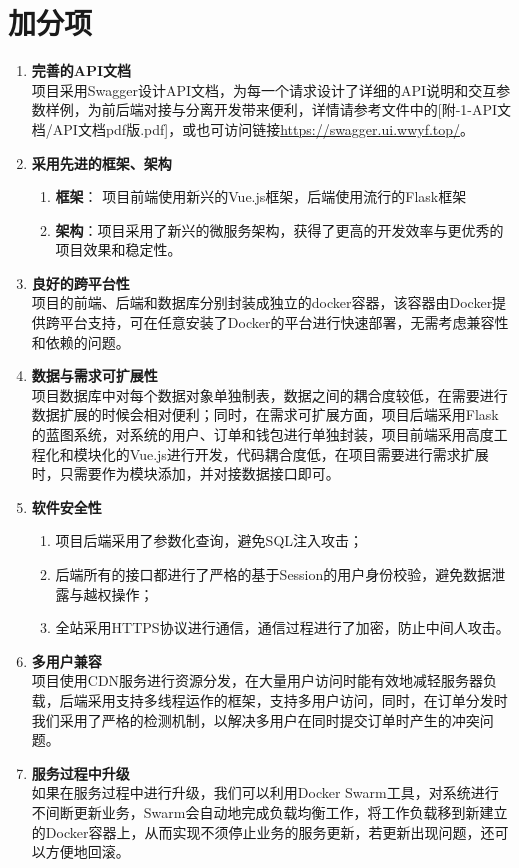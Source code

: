 \chapter{加分项}

\begin{enumerate}
    \item \textbf{完善的API文档} \\
    项目采用Swagger设计API文档，为每一个请求设计了详细的API说明和交互参数样例，为前后端对接与分离开发带来便利，详情请参考文件中的[附-1-API文档/API文档pdf版.pdf]，或也可访问链接\url{https://swagger.ui.wwyf.top/}。
    \item \textbf{采用先进的框架、架构} 
    \begin{enumerate}
        \item \textbf{框架}： 项目前端使用新兴的Vue.js框架，后端使用流行的Flask框架
        \item \textbf{架构}：项目采用了新兴的微服务架构，获得了更高的开发效率与更优秀的项目效果和稳定性。
    \end{enumerate}
    \item \textbf{良好的跨平台性} \\
    项目的前端、后端和数据库分别封装成独立的docker容器，该容器由Docker提供跨平台支持，可在任意安装了Docker的平台进行快速部署，无需考虑兼容性和依赖的问题。
    \item \textbf{数据与需求可扩展性} \\
    项目数据库中对每个数据对象单独制表，数据之间的耦合度较低，在需要进行数据扩展的时候会相对便利；同时，在需求可扩展方面，项目后端采用Flask的蓝图系统，对系统的用户、订单和钱包进行单独封装，项目前端采用高度工程化和模块化的Vue.js进行开发，代码耦合度低，在项目需要进行需求扩展时，只需要作为模块添加，并对接数据接口即可。
    \item \textbf{软件安全性}
    \begin{enumerate}
        \item 项目后端采用了参数化查询，避免SQL注入攻击；
        \item 后端所有的接口都进行了严格的基于Session的用户身份校验，避免数据泄露与越权操作；
        \item 全站采用HTTPS协议进行通信，通信过程进行了加密，防止中间人攻击。 
    \end{enumerate}
    \item \textbf{多用户兼容} \\
    项目使用CDN服务进行资源分发，在大量用户访问时能有效地减轻服务器负载，后端采用支持多线程运作的框架，支持多用户访问，同时，在订单分发时我们采用了严格的检测机制，以解决多用户在同时提交订单时产生的冲突问题。
    \item \textbf{服务过程中升级} \\
    如果在服务过程中进行升级，我们可以利用Docker Swarm工具，对系统进行不间断更新业务，Swarm会自动地完成负载均衡工作，将工作负载移到新建立的Docker容器上，从而实现不须停止业务的服务更新，若更新出现问题，还可以方便地回滚。
\end{enumerate}
